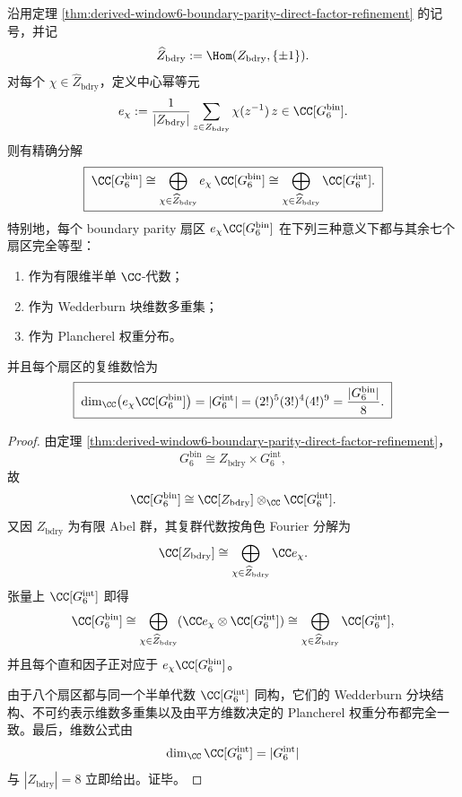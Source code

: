 \begin{theorem}\label{thm:derived-window6-boundary-sector-groupalgebra-isotypy}
沿用定理 \ref{thm:derived-window6-boundary-parity-direct-factor-refinement} 的记号，并记
\[
\widehat Z_{\mathrm{bdry}}:=\Hom(Z_{\mathrm{bdry}},\{\pm1\}).
\]
对每个 \(\chi\in \widehat Z_{\mathrm{bdry}}\)，定义中心幂等元
\[
e_\chi:=\frac{1}{|Z_{\mathrm{bdry}}|}
\sum_{z\in Z_{\mathrm{bdry}}}\chi(z^{-1})\,z
\in \CC[G_6^{\mathrm{bin}}].
\]
则有精确分解
\[
\boxed{\;
\CC[G_6^{\mathrm{bin}}]
\cong
\bigoplus_{\chi\in\widehat Z_{\mathrm{bdry}}}
e_\chi\,\CC[G_6^{\mathrm{bin}}]
\cong
\bigoplus_{\chi\in\widehat Z_{\mathrm{bdry}}}
\CC[G_6^{\mathrm{int}}].\;}
\]
特别地，每个 boundary parity 扇区 \(e_\chi\CC[G_6^{\mathrm{bin}}]\) 在下列三种意义下都与其余七个扇区完全等型：
\begin{enumerate}
  \item 作为有限维半单 \(\CC\)-代数；
  \item 作为 Wedderburn 块维数多重集；
  \item 作为 Plancherel 权重分布。
\end{enumerate}
并且每个扇区的复维数恰为
\[
\boxed{\;
\dim_{\CC}\bigl(e_\chi\CC[G_6^{\mathrm{bin}}]\bigr)
=
|G_6^{\mathrm{int}}|
=
(2!)^5(3!)^4(4!)^9
=
\frac{|G_6^{\mathrm{bin}}|}{8}.\;}
\]
\end{theorem}
\begin{proof}
由定理 \ref{thm:derived-window6-boundary-parity-direct-factor-refinement}，
\[
G_6^{\mathrm{bin}}\cong Z_{\mathrm{bdry}}\times G_6^{\mathrm{int}},
\]
故
\[
\CC[G_6^{\mathrm{bin}}]
\cong
\CC[Z_{\mathrm{bdry}}]\otimes_{\CC}\CC[G_6^{\mathrm{int}}].
\]
又因 \(Z_{\mathrm{bdry}}\) 为有限 Abel 群，其复群代数按角色 Fourier 分解为
\[
\CC[Z_{\mathrm{bdry}}]
\cong
\bigoplus_{\chi\in\widehat Z_{\mathrm{bdry}}}\CC e_\chi.
\]
张量上 \(\CC[G_6^{\mathrm{int}}]\) 即得
\[
\CC[G_6^{\mathrm{bin}}]
\cong
\bigoplus_{\chi\in\widehat Z_{\mathrm{bdry}}}
(\CC e_\chi\otimes \CC[G_6^{\mathrm{int}}])
\cong
\bigoplus_{\chi\in\widehat Z_{\mathrm{bdry}}}
\CC[G_6^{\mathrm{int}}],
\]
并且每个直和因子正对应于 \(e_\chi\CC[G_6^{\mathrm{bin}}]\)。

由于八个扇区都与同一个半单代数 \(\CC[G_6^{\mathrm{int}}]\) 同构，它们的 Wedderburn 分块结构、不可约表示维数多重集以及由平方维数决定的 Plancherel 权重分布都完全一致。最后，维数公式由
\[
\dim_{\CC}\CC[G_6^{\mathrm{int}}]=|G_6^{\mathrm{int}}|
\]
与 \(|Z_{\mathrm{bdry}}|=8\) 立即给出。证毕。
\end{proof}

